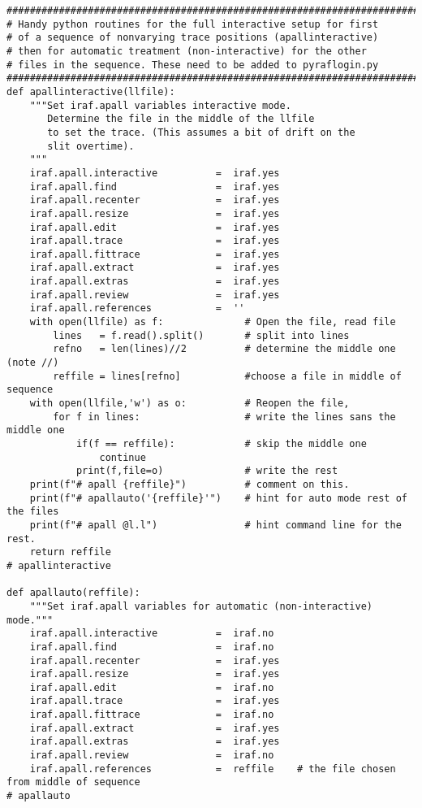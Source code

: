 {\begin{verbatim}
#############################################################################
# Handy python routines for the full interactive setup for first
# of a sequence of nonvarying trace positions (apallinteractive)
# then for automatic treatment (non-interactive) for the other
# files in the sequence. These need to be added to pyraflogin.py
#############################################################################
def apallinteractive(llfile):
    """Set iraf.apall variables interactive mode.
       Determine the file in the middle of the llfile
       to set the trace. (This assumes a bit of drift on the
       slit overtime).
    """
    iraf.apall.interactive          =  iraf.yes
    iraf.apall.find                 =  iraf.yes
    iraf.apall.recenter             =  iraf.yes
    iraf.apall.resize               =  iraf.yes
    iraf.apall.edit                 =  iraf.yes
    iraf.apall.trace                =  iraf.yes
    iraf.apall.fittrace             =  iraf.yes
    iraf.apall.extract              =  iraf.yes
    iraf.apall.extras               =  iraf.yes
    iraf.apall.review               =  iraf.yes
    iraf.apall.references           =  ''
    with open(llfile) as f:              # Open the file, read file
        lines   = f.read().split()       # split into lines
        refno   = len(lines)//2          # determine the middle one (note //)
        reffile = lines[refno]           #choose a file in middle of sequence
    with open(llfile,'w') as o:          # Reopen the file,
        for f in lines:                  # write the lines sans the middle one
            if(f == reffile):            # skip the middle one
                continue
            print(f,file=o)              # write the rest
    print(f"# apall {reffile}")          # comment on this.
    print(f"# apallauto('{reffile}'")    # hint for auto mode rest of the files
    print(f"# apall @l.l")               # hint command line for the rest.
    return reffile
# apallinteractive

def apallauto(reffile):
    """Set iraf.apall variables for automatic (non-interactive) mode."""
    iraf.apall.interactive          =  iraf.no
    iraf.apall.find                 =  iraf.no
    iraf.apall.recenter             =  iraf.yes
    iraf.apall.resize               =  iraf.yes
    iraf.apall.edit                 =  iraf.no
    iraf.apall.trace                =  iraf.yes
    iraf.apall.fittrace             =  iraf.no
    iraf.apall.extract              =  iraf.yes
    iraf.apall.extras               =  iraf.yes
    iraf.apall.review               =  iraf.no
    iraf.apall.references           =  reffile    # the file chosen from middle of sequence
# apallauto


\end{verbatim}}
